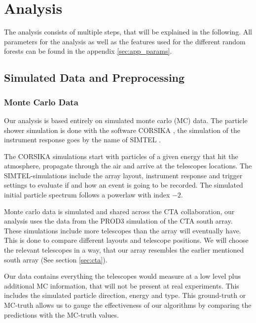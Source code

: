 \chapter{Analysis}
\label{analysis}

The analysis consists of multiple steps, that will be explained in the following.
All parameters for the analysis as well as the features used for the
different random forests can be found in the appendix \ref{sec:app_params}.

\section{Simulated Data and Preprocessing}

\subsection{Monte Carlo Data}
Our analysis is based entirely on simulated monte carlo (MC) data.
The particle shower simulation is done with the software CORSIKA \cite{heck1998corsika}, 
the simulation of the instrument response goes by the name of SIMTEL \cite{BERNLOHR2008149}.

The CORSIKA simulations start with particles of a given energy that hit the atmosphere,
propagate through the air and arrive at the telescopes locations.
The SIMTEL-simulations include the array layout, instrument response and trigger settings to
evaluate if and how an event is going to be recorded.
The simulated initial particle spectrum follows a powerlaw with index $\num{-2}$.

Monte carlo data is simulated and shared across the CTA collaboration, 
our analysis uses the data from the PROD3 simulation of 
the CTA south array. These simulations include more telescopes 
than the array will eventually have. This is done to compare
different layouts and telescope positions.
We will choose the relevant telescopes in a way, that
our array resembles the earlier mentioned south array (See section \ref{sec:cta}).

Our data contains everything the telescopes would measure
at a low level
plus additional MC information, that will not be present at real experiments.
This includes the simulated particle direction, energy and type.
This ground-truth or MC-truth allows us to gauge the effectiveness of our 
algorithms by comparing the predictions with the MC-truth values.


